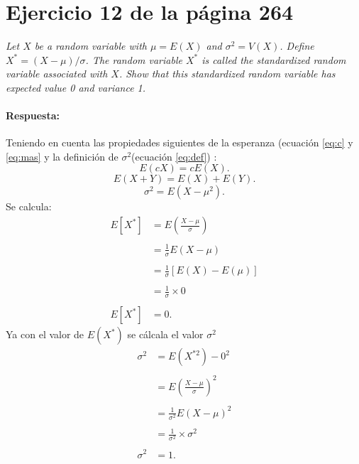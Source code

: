 \documentclass{article}
\begin{document}
\section{Ejercicio 12 de la página 264}    
\emph{Let $X$ be a random variable with $\mu = E(X)$ and $\sigma^2 = V(X)$. Define $X^\ast = (X-\mu)/\sigma$. The random variable $X^\ast$ is called the standardized random variable associated with $X$. Show that this standardized random variable has expected value 0 and variance 1.} 

\paragraph{Respuesta:} Teniendo en cuenta las propiedades siguientes de la esperanza (ecuación \ref{eq:c} y \ref{eq:mas} y la definición de $\sigma^{2}$(ecuación \ref{eq:def}) :
\begin{equation}\label{eq:c}
 E(cX)= cE(X).   
\end{equation}
\begin{equation}\label{eq:mas}
 E(X+Y)= E(X)+ E(Y). 
\end{equation}
\begin{equation}\label{eq:def}
 \sigma^{2}= E(X-\mu^{2}). 
\end{equation}
Se calcula:
\begin{equation}
\begin{array}{ll}
   E[X^{*}] &= E\left(\frac{X-\mu}{\sigma}\right) \\
   &\\
   & = \frac{1}{\sigma}E(X-\mu)  \\
   &\\
   & = \frac{1}{\sigma}\left[E(X) - E(\mu)\right]\\
&\\
   & = \frac{1}{\sigma}\times 0 \\
&\\
   E[X^{*}] & = 0.
      \end{array}
   \end{equation}
Ya con el valor de $E(X^{*})$ se cálcala el valor $\sigma^{2}$
\begin{equation}
\begin{array}{ll}
   \sigma ^{2} & = E(X^{*2})- 0^{2}  \\
   &\\
   &= E\left(\frac{X-\mu}{\sigma}\right)^{2}\\
    &\\
   &=  \frac{1}{\sigma^{2}} E(X-\mu)^{2}\\
   &\\
     &=\frac{1}{\sigma^{2}} \times \sigma^{2}\\
      &\\
   \sigma ^{2} & = 1. 
     \end{array}
   \end{equation}
   
\end{document}
